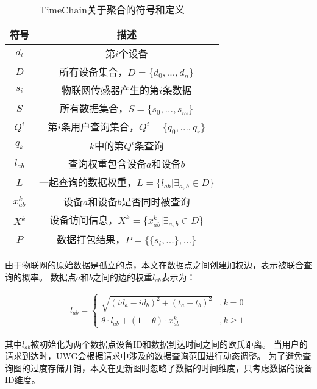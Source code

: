 \begin{table}
    \centering
    \caption{TimeChain关于聚合的符号和定义}
    \begin{tabular}{|c|c|}
        \hline
        \textbf{符号} & \textbf{描述} \\
        \hline
        $d_i$   & 第$i$个设备 \\
        \hline
        $D$     & 所有设备集合，$D = \{d_0, ..., d_n\}$\\
        \hline
        $s_i$   & 物联网传感器产生的第$i$条数据 \\
        \hline
        $S$     & 所有数据集合，$S = \{s_0, ..., s_m \}$\\
        \hline
        $Q^i$   & 第$i$条用户查询集合，$Q^i = \{ q_0, ..., q_r \}$\\
        \hline
        $q_k$   & $k$中的第$Q^i$条查询 \\
        \hline
        $l_{ab}$& 查询权重包含设备$a$和设备$b$ \\
        \hline
        $L$     & 一起查询的数据权重，$L = \{l_{ab} | \exists_{a,b} \in D \}$\\
        \hline
        $x^k_{ab}$ & 设备$a$和设备$b$是否同时被查询 \\
        \hline
        $X^k$   & 设备访问信息，$X^k = \{x^k_{ab} | \exists_{a,b} \in D \}$\\
        \hline
        $P$     & 数据打包结果，$P = \{ \{ s_i, ... \}, ... \}$\\
        \hline
    \end{tabular}
    \label{tab:notations}
\end{table}

由于物联网的原始数据是孤立的点，本文在数据点之间创建加权边，表示被联合查询的概率。
数据点$a$和$b$之间的边的权重$l_{ab}$表示为：

\begin{equation} 
    \label{eq:weight}
    \begin{split}
        l_{ab} =
        \begin{cases}
            \sqrt{ (id_a - id_b)^2 + (t_a - t_b)^2 } &, k = 0 \\  
            \theta \cdot l_{ab} + (1 - \theta) \cdot x_{ab}^k &, k \geq 1  
        \end{cases}
    \end{split}
\end{equation}

其中$l_{ab}$被初始化为两个数据点设备ID和数据到达时间之间的欧氏距离。
当用户的请求到达时，UWG会根据请求中涉及的数据查询范围进行动态调整。
为了避免查询图的过度存储开销，本文在更新图时忽略了数据的时间维度，只考虑数据的设备ID维度。

